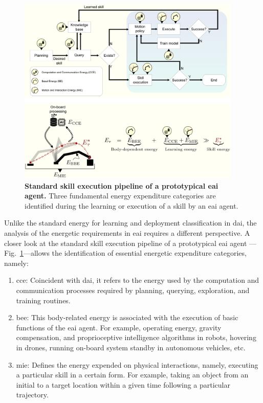 \documentclass[12pt]{article}
\begin{document}
\begin{figure}[t!]
	\centering
	\hspace*{\fill}
	\includegraphics[width=0.95\textwidth]{eai_energy_categories.png}
	\hspace*{\fill}
	\caption[] {\label{fig:embodied_ai_pipeline} \textbf{Standard skill execution pipeline of a prototypical \ac{eai} agent.} {Three fundamental energy expenditure categories are identified during the learning or execution of a skill by an \ac{eai} agent.}}
\end{figure}

Unlike the standard energy for learning and deployment classification in \ac{dai}, the analysis of the energetic requirements in \ac{eai} requires a different perspective. A closer look at the standard skill execution pipeline of a prototypical \ac{eai} agent ---Fig.~\ref{fig:embodied_ai_pipeline}---allows the identification of essential energetic expenditure categories, namely:
\begin{enumerate}
	\item \Ac{cce}: Coincident with \ac{dai}, it refers to the energy used by the computation and communication processes required by planning, querying, exploration, and training routines.
	\item \Ac{bee}: This body-related energy is associated with the execution of basic functions of the \ac{eai} agent. For example, operating energy, gravity compensation, and proprioceptive intelligence algorithms in robots, hovering in drones, running on-board system standby in autonomous vehicles, etc.
	\item \Ac{mie}: Defines the energy expended on physical interactions, namely, executing a particular skill in a certain form. For example, taking an object from an initial to a target location within a given time following a particular trajectory.
\end{enumerate}
\end{document}
